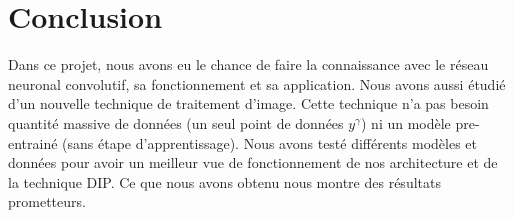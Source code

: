 \documentclass[
  11pt,
  dvipsnames]{article}
\begin{document}
\newpage

\hypertarget{conclusion}{%
\section{Conclusion}\label{conclusion}}

Dans ce projet, nous avons eu le chance de faire la connaissance avec le réseau neuronal convolutif, sa fonctionnement et sa application. Nous avons aussi étudié d'un nouvelle technique de traitement d'image. Cette technique n'a pas besoin quantité massive de données (un seul point de données \(y^\gamma\)) ni un modèle pre-entrainé (sans étape d'apprentissage). Nous avons testé différents modèles et données pour avoir un meilleur vue de fonctionnement de nos architecture et de la technique DIP. Ce que nous avons obtenu nous montre des résultats prometteurs.
\newpage

\printbibliography
\end{document}
